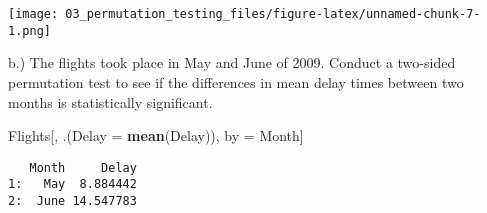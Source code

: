 \documentclass[
  12pt,
]{report}
\newenvironment{Shaded}{\begin{snugshade}}{\end{snugshade}}
\newcommand{\DataTypeTok}[1]{\textcolor[rgb]{0.13,0.29,0.53}{#1}}
\newcommand{\KeywordTok}[1]{\textcolor[rgb]{0.13,0.29,0.53}{\textbf{#1}}}
\newcommand{\NormalTok}[1]{#1}
\newcommand{\StringTok}[1]{\textcolor[rgb]{0.31,0.60,0.02}{#1}}
\begin{document}
\texttt{[image: 03\_permutation\_testing\_files/figure-latex/unnamed-chunk-7-1.png]}

b.) The flights took place in May and June of 2009. Conduct a two-sided
permutation test to see if the differences in mean delay times between
two months is statistically significant.

\begin{Shaded}
\begin{Highlighting}[]
\NormalTok{Flights[, .(}\DataTypeTok{Delay =} \KeywordTok{mean}\NormalTok{(Delay)), by =}\StringTok{ }\NormalTok{Month]}
\end{Highlighting}
\end{Shaded}

\begin{verbatim}
   Month     Delay
1:   May  8.884442
2:  June 14.547783
\end{verbatim}
\end{document}
